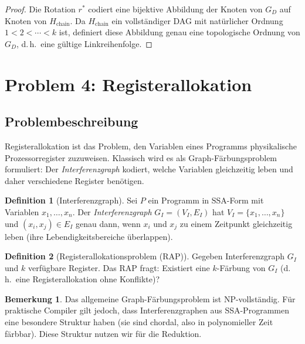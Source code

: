 ﻿\documentclass[a4paper,12pt]{article}
\theoremstyle{definition}
\newtheorem{definition}{Definition}
\newtheorem{bemerkung}{Bemerkung}
\begin{document}
\begin{proof}
Die Rotation $r^*$ codiert eine bijektive Abbildung der Knoten von $G_D$ auf Knoten von $H_{\text{chain}}$. Da $H_{\text{chain}}$ ein vollständiger DAG mit natürlicher Ordnung $1 < 2 < \cdots < k$ ist, definiert diese Abbildung genau eine topologische Ordnung von $G_D$, d.\,h.\ eine gültige Linkreihenfolge.
\end{proof}

\section{Problem 4: Registerallokation}
\label{sec:reg}

\subsection{Problembeschreibung}

Registerallokation ist das Problem, den Variablen eines Programms physikalische Prozessorregister zuzuweisen. Klassisch wird es als Graph-Färbungsproblem formuliert: Der \emph{Interferenzgraph} kodiert, welche Variablen gleichzeitig leben und daher verschiedene Register benötigen.

\begin{definition}[Interferenzgraph]
\label{def:ig}
Sei $P$ ein Programm in SSA-Form mit Variablen $x_1, \ldots, x_n$. Der \emph{Interferenzgraph} $G_I = (V_I, E_I)$ hat $V_I = \{x_1, \ldots, x_n\}$ und $(x_i, x_j) \in E_I$ genau dann, wenn $x_i$ und $x_j$ zu einem Zeitpunkt gleichzeitig leben (ihre Lebendigkeitsbereiche überlappen).
\end{definition}

\begin{definition}[Registerallokationsproblem (RAP)]
\label{def:rap}
Gegeben Interferenzgraph $G_I$ und $k$ verfügbare Register. Das RAP fragt: Existiert eine $k$-Färbung von $G_I$ (d.\,h.\ eine Registerallokation ohne Konflikte)?
\end{definition}

\begin{bemerkung}
Das allgemeine Graph-Färbungsproblem ist NP-vollständig. Für praktische Compiler gilt jedoch, dass Interferenzgraphen aus SSA-Programmen eine besondere Struktur haben (sie sind chordal, also in polynomieller Zeit färbbar). Diese Struktur nutzen wir für die Reduktion.
\end{bemerkung}
\end{document}
